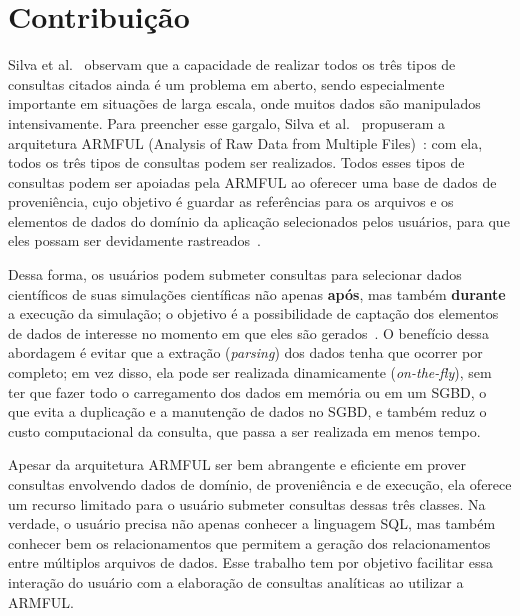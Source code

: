\section{Contribuição}

Silva et al.~\cite{silva2015analyzing} observam que a capacidade de realizar todos os três tipos de consultas citados ainda é um problema em aberto, sendo especialmente importante em situações de larga escala, onde muitos dados são manipulados intensivamente.
Para preencher esse gargalo, Silva et al.~\cite{silva2015analyzing} propuseram a arquitetura  ARMFUL (Analysis of Raw Data from Multiple Files)~\cite{silva2017raw,silva2016situ}: com ela, todos os três tipos de consultas podem ser realizados. Todos esses tipos de consultas podem ser apoiadas pela ARMFUL ao oferecer uma base de dados de proveniência, cujo objetivo é guardar as referências para os arquivos e os elementos de dados do domínio da aplicação selecionados pelos usuários, para que eles possam ser devidamente rastreados~\cite{silva2015analyzing}.

Dessa forma, os usuários podem submeter consultas para selecionar dados científicos de suas simulações científicas não apenas \textbf{após}, mas também \textbf{durante} a execução da simulação; o objetivo é a possibilidade de captação dos elementos de dados de interesse no momento em que eles são gerados~\cite{silva2015analyzing}. O benefício dessa abordagem é evitar que a extração (\textit{parsing}) dos dados tenha que ocorrer por completo; em vez disso, ela pode ser realizada dinamicamente (\textit{on-the-fly}), sem ter que fazer todo o carregamento dos dados em memória ou em um SGBD, o que evita a duplicação e a manutenção de dados no SGBD, e também reduz o custo computacional da consulta, que passa a ser realizada em menos tempo.

Apesar da arquitetura ARMFUL ser bem abrangente e eficiente em prover consultas envolvendo dados de domínio, de proveniência e de execução, ela oferece um recurso limitado para o usuário submeter consultas dessas três classes. Na verdade, o usuário precisa não apenas conhecer a linguagem SQL, mas também conhecer bem os relacionamentos que permitem a geração dos relacionamentos entre múltiplos arquivos de dados.
Esse trabalho tem por objetivo facilitar essa interação do usuário com a elaboração de consultas analíticas ao utilizar a ARMFUL.

